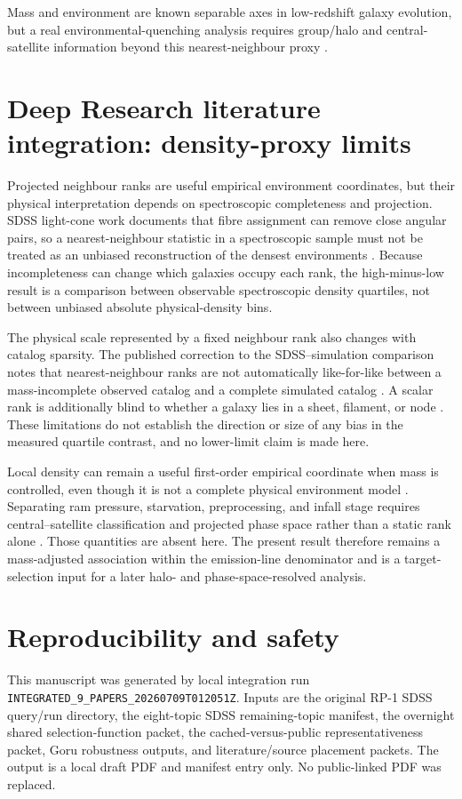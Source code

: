 \documentclass[twocolumn]{aastex702}
\begin{document}
Mass and environment are known separable axes in low-redshift galaxy evolution, but a real environmental-quenching analysis requires group/halo and central-satellite information beyond this nearest-neighbour proxy \citep{peng2010,baldry2006,wetzel2013,goubert2024}.


\section{Deep Research literature integration: density-proxy limits}\label{sec:dr-r1}
Projected neighbour ranks are useful empirical environment coordinates, but their physical interpretation depends on spectroscopic completeness and projection. SDSS light-cone work documents that fibre assignment can remove close angular pairs, so a nearest-neighbour statistic in a spectroscopic sample must not be treated as an unbiased reconstruction of the densest environments \citep{dongpaez2024}. Because incompleteness can change which galaxies occupy each rank, the high-minus-low result is a comparison between observable spectroscopic density quartiles, not between unbiased absolute physical-density bins.

The physical scale represented by a fixed neighbour rank also changes with catalog sparsity. The published correction to the SDSS--simulation comparison notes that nearest-neighbour ranks are not automatically like-for-like between a mass-incomplete observed catalog and a complete simulated catalog \citep{goubert2024,goubert2024corr}. A scalar rank is additionally blind to whether a galaxy lies in a sheet, filament, or node \citep{nandi2025}. These limitations do not establish the direction or size of any bias in the measured quartile contrast, and no lower-limit claim is made here.

Local density can remain a useful first-order empirical coordinate when mass is controlled, even though it is not a complete physical environment model \citep{okane2024}. Separating ram pressure, starvation, preprocessing, and infall stage requires central--satellite classification and projected phase space rather than a static rank alone \citep{oxland2024,sampaio2024}. Those quantities are absent here. The present result therefore remains a mass-adjusted association within the emission-line denominator and is a target-selection input for a later halo- and phase-space-resolved analysis.

\section{Reproducibility and safety}\label{sec:repro}
This manuscript was generated by local integration run \texttt{INTEGRATED\_9\_PAPERS\_20260709T012051Z}. Inputs are the original RP-1 SDSS query/run directory, the eight-topic SDSS remaining-topic manifest, the overnight shared selection-function packet, the cached-versus-public representativeness packet, Goru robustness outputs, and literature/source placement packets. The output is a local draft PDF and manifest entry only. No public-linked PDF was replaced.
\end{document}
